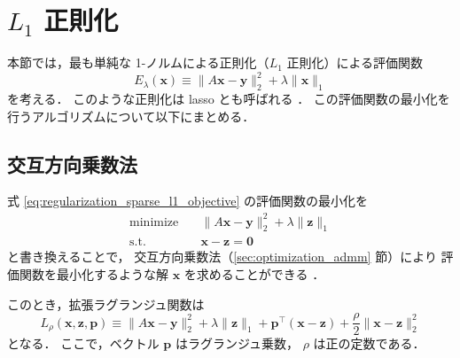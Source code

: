 %

\section[L1 正則化]{$L_1$ 正則化}

本節では，最も単純な 1-ノルムによる正則化（$L_1$ 正則化）による評価関数
\begin{equation}
    E_{\lambda}(\bm{x}) \equiv \|A \bm{x} - \bm{y}\|_2^2 + \lambda \|\bm{x}\|_1
    \label{eq:regularization_sparse_l1_objective}
\end{equation}
を考える．
このような正則化は lasso とも呼ばれる \cite{Boyd2010}．
この評価関数の最小化を行うアルゴリズムについて以下にまとめる．

\subsection{交互方向乗数法}

式 \eqref{eq:regularization_sparse_l1_objective} の評価関数の最小化を
\begin{equation}
    \begin{aligned}
        \text{minimize} \hspace{1em} & \|A \bm{x} - \bm{y}\|_2^2 + \lambda \|\bm{z}\|_1 \\
        \text{s.t.} \hspace{1em}     & \bm{x} - \bm{z} = \bm{0}
    \end{aligned}
\end{equation}
と書き換えることで，
交互方向乗数法（\ref{sec:optimization_admm} 節）により
評価関数を最小化するような解 $\bm{x}$ を求めることができる \cite{Boyd2010}．

このとき，拡張ラグランジュ関数は
\begin{equation}
    L_{\rho}(\bm{x}, \bm{z}, \bm{p}) \equiv
    \|A \bm{x} - \bm{y}\|_2^2 + \lambda \|\bm{z}\|_1
    + \bm{p}^\top (\bm{x} - \bm{z})
    + \frac{\rho}{2} \|\bm{x} - \bm{z}\|_2^2
\end{equation}
となる．
ここで，ベクトル $\bm{p}$ はラグランジュ乗数，
$\rho$ は正の定数である．

